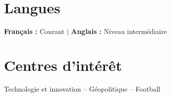 \documentclass[letterpaper,11pt]{article}
\begin{document}
\vspace{4pt}

\section{Langues}
\small{\textbf{Fran\c{c}ais :} Courant \quad $|$ \quad \textbf{Anglais :} Niveau interm\'ediaire}

\vspace{4pt}

\section{Centres d'int\'er\^et}
\small{Technologie et innovation -- G\'eopolitique -- Football}
\end{document}
